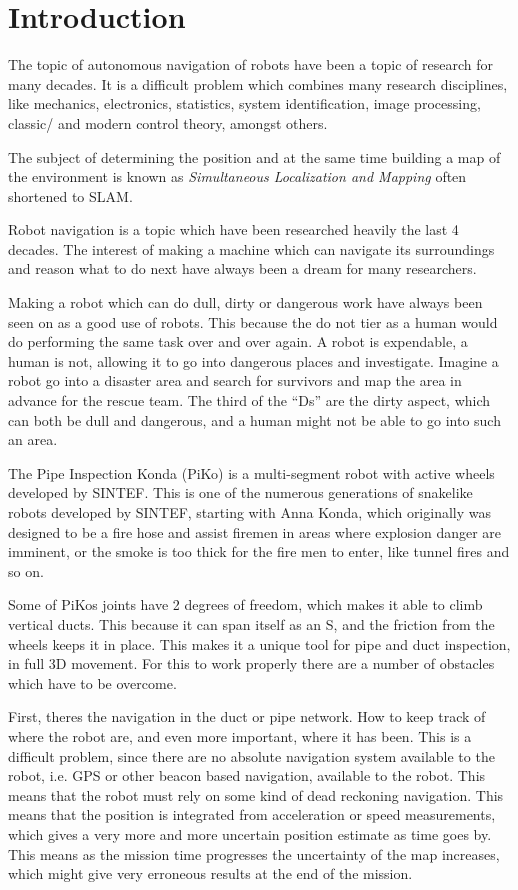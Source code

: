 
\chapter{Introduction}
The topic of autonomous navigation of robots have been a topic of research for many
decades. It is a difficult problem which combines many research disciplines, like 
mechanics, electronics, statistics, system identification, image processing, classic/ and
modern control theory, amongst others. 

The subject of determining the position and at the same time building a map of
the environment is known as \emph{Simultaneous Localization and Mapping} often shortened
to SLAM.



Robot navigation is a topic which have been researched heavily the last 4 decades. The
interest of making a machine which can navigate its surroundings and reason what to do
next have always been a dream for many researchers. 

Making a robot which can do dull, dirty  or dangerous work have always been seen on as a
good use of robots. This because the do not tier as a human would do performing the same
task over and over again. A robot is expendable, a human is not, allowing it to go into
dangerous places and investigate. Imagine a robot go into a disaster area and search for
survivors and map the area in advance for the rescue team. The third of the ``Ds'' are the
dirty aspect, which can both be dull and dangerous, and a human might not be able to go
into such an area. 

The Pipe Inspection Konda (PiKo)\cite{piko} is a multi-segment robot with active wheels developed by
SINTEF. This is one of the numerous generations of snakelike robots
developed by SINTEF, starting with Anna Konda, which originally was designed to be a fire
hose and assist firemen in areas where explosion danger are imminent, or the smoke is too
thick for the fire men to enter, like tunnel fires and so on. 

Some of PiKos joints have 2 degrees of freedom, which makes it able to climb vertical ducts. This
because it can span itself as an S, and the friction from the wheels keeps it in place.
This makes it a unique tool for pipe and duct inspection, in full 3D movement. 
For this to work properly there are a number of obstacles which have to be overcome. 

First, theres the navigation in the duct or pipe network. How to keep track of where the robot
are, and even more important, where it has been. This is a difficult problem, since there
are no absolute navigation system available to the robot, i.e. GPS or other beacon based
navigation, available to the robot. This means that the robot must rely on some kind of
dead reckoning navigation. This means that the position is integrated from acceleration or
speed measurements, which gives a very more and more uncertain position estimate as time
goes by. This means as the mission time progresses the uncertainty of the map increases,
which might give very erroneous results at the end of the mission.

